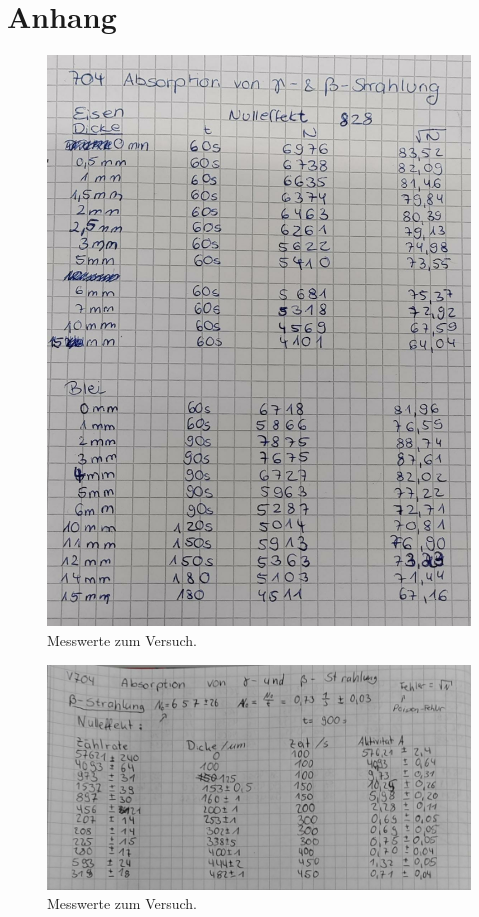 \section{Anhang}\label{sec:Anhang}
\begin{figure}[h]
   \centering
    \includegraphics[scale=0.45]{build/KladdeS1.jpeg}
   \caption{Messwerte zum Versuch.}
\end{figure}
\begin{figure}[h]
    \centering
     \includegraphics[scale=0.45]{build/KladdeS2.jpeg}
    \caption{Messwerte zum Versuch.}
 \end{figure}
\pagebreak
